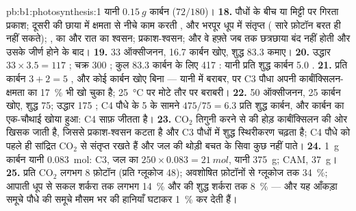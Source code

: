 \begin{solution}{pb:b1:photosynthesis:1}
यानी $\qty{0.15}{g}$ कार्बन ($72/180$)।
\textbf{18.} पौधों के बीच या मिट्टी पर गिरता प्रकाश; दूसरी  की
छाया में क्षमता से नीचे काम करती , और भरपूर धूप में संतृप्त
 ( सारे फ़ोटॉन बरत ही नहीं सकते); ,  का और रात का
श्वसन; प्रकाश-श्वसन; और वे हफ़्ते जब तक छत्रछाया बंद नहीं होती और उसके
जीर्ण होने के बाद।
\textbf{19.} 33 ऑक्सीजनन, 16.7 कार्बन खोए, शुद्ध 83.3 कमाए।
\textbf{20.} उद्धार $33\times 3.5 = 117$ ; चक्र 300 ; कुल
83.3 कार्बन के लिए 417 : यानी प्रति शुद्ध कार्बन 5.0 .
\textbf{21.} प्रति कार्बन $3 + 2 = 5$ , और कोई कार्बन खोए बिना ---
यानी  में बराबर, पर C3 पौधा अपनी कार्बॉक्सिलन-क्षमता का
\qty{17}{\%} भी खो चुका है; \qty{25}{\celsius} पर मोटे तौर पर बराबरी।
\textbf{22.} 50 ऑक्सीजनन, 25 कार्बन खोए, शुद्ध 75; उद्धार 175 ;
C4 पौधे के 5 के सामने $475/75 = 6.3$  प्रति शुद्ध कार्बन, और
कार्बन का एक-चौथाई खोया हुआ: C4 साफ़ जीतता है।
\textbf{23.} $\mathrm{CO_2}$ तिगुनी करने से  की होड़
कार्बॉक्सिलन की ओर खिसक जाती है, जिससे प्रकाश-श्वसन कटता है और C3 पौधों
में शुद्ध स्थिरीकरण चढ़ता है; C4 पौधे  को पहले ही सांद्रित
$\mathrm{CO_2}$ से संतृप्त रखते हैं और जल की थोड़ी बचत के सिवा कुछ नहीं
पाते।
\textbf{24.} \qty{1}{g} कार्बन यानी \qty{0.083}{mol}: C3, जल का $250\times 0.083 = \qty{21}{mol}$, यानी \qty{375}{g}; CAM, \qty{37}{g}।
\textbf{25.} प्रति $\mathrm{CO_2}$ लगभग 8 फ़ोटॉन (प्रति ग्लूकोज 48);
अवशोषित फ़ोटॉनों से ग्लूकोज तक \qty{34}{\%}; आपाती धूप से सकल शर्करा तक
लगभग \qty{14}{\%} और  की शुद्ध शर्करा तक \qty{8}{\%} --- और यह
आँकड़ा समूचे पौधे की समूचे मौसम भर की हानियाँ घटाकर \qty{1}{\%} कर देती
हैं।
\end{solution}
